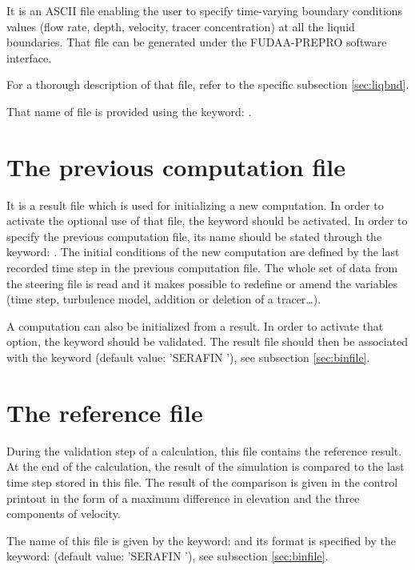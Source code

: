 It is an ASCII file enabling the user to specify time-varying boundary
conditions values (flow rate, depth, velocity, tracer concentration) at all the
liquid boundaries. That file can be generated under the FUDAA-PREPRO software
interface.

For a thorough description of that file, refer to the specific subsection
\ref{sec:liqbnd}.

That name of file is provided using the keyword: .


\section{The previous computation file}
\label{sec:previousfile}

It is a  result file which is used for initializing a new
computation. In order to activate the optional use of that file, the keyword
 should be activated. In order to specify the
previous computation file, its name should be stated through the keyword:
. The initial conditions of the new
computation are defined by the last recorded time step in the previous
computation file. The whole set of data from the steering file is read and it
makes possible to redefine or amend the variables (time step, turbulence model,
addition or deletion of a tracer\dots).

A computation can also be initialized from a  result. In order to
activate that option, the  keyword
should be validated. The  result file should then be associated with
the  keyword (default
value: 'SERAFIN '), see subsection \ref{sec:binfile}.


\section{The reference file}

During the validation step of a calculation, this file contains the reference
result.
At the end of the calculation, the result of the simulation is compared to the
last time step stored in this file. The result of the comparison is given in
the control printout in the form of a maximum difference in elevation and the
three components of velocity.

The name of this file is given by the keyword:  and its
format is specified by the keyword:  (default
value: 'SERAFIN '), see subsection \ref{sec:binfile}.


